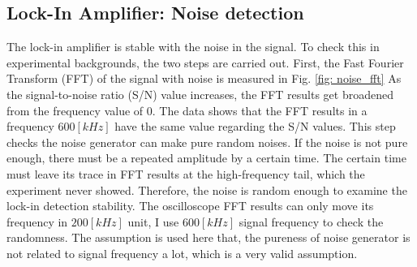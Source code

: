 \documentclass{article}
\begin{document}
\subsection{Lock-In Amplifier: Noise detection}
\label{results: noise detection}
 The lock-in amplifier is stable with the noise in the signal.
 To check this in experimental backgrounds, the two steps are carried out.
 First, the Fast Fourier Transform (FFT) of the signal with noise is measured in Fig. \ref{fig: noise_fft}
 As the signal-to-noise ratio (S/N) value increases, the FFT results get broadened from the frequency value of 0.
 The data shows that the FFT results in a frequency $600 [kHz]$ have the same value regarding the S/N values.
 This step checks the noise generator can make pure random noises.
 If the noise is not pure enough, there must be a repeated amplitude by a certain time.
 The certain time must leave its trace in FFT results at the high-frequency tail, which the experiment never showed.
 Therefore, the noise is random enough to examine the lock-in detection stability.
 The oscilloscope FFT results can only move its frequency in $200 [kHz]$ unit, I use $600 [kHz]$ signal frequency to check the randomness.
 The assumption is used here that, the pureness of noise generator is not related to signal frequency a lot, which is a very valid assumption.
\end{document}
